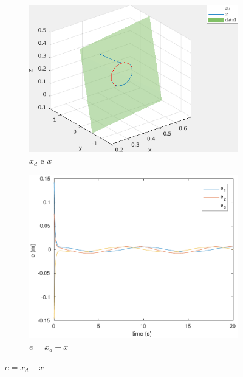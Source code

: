 \documentclass[a4paper,11pt]{article}
\theoremstyle{mytheor}
\begin{document}
\begin{figure}[!ht]
\centering
  \begin{minipage}{\linewidth}
  \centering
    \begin{subfigure}[b]{0.4\textwidth}
    \includegraphics[width=1\textwidth]{figs/ex1_c_2_x.png}
    \caption{$x_d$ e $x$}
    \label{fig:ex1_c_2_x}
    \end{subfigure}
  \end{minipage}
  \begin{minipage}{\linewidth}
  \centering
    \begin{subfigure}[b]{0.4\textwidth}
    \includegraphics[width=1\textwidth]{figs/ex1_c_2_e.pdf}
    \caption{$e = x_d - x$}
    \label{fig:ex1_c_2_e}
    \end{subfigure}

\end{minipage}
\end{figure}
\end{document}

